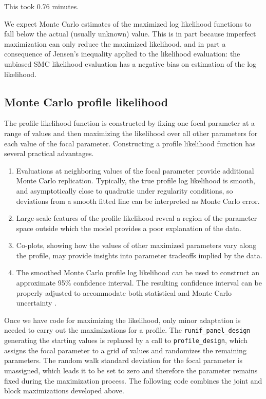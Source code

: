 \documentclass[12pt]{article}\usepackage[]{graphicx}\usepackage[table]{xcolor}
\newcommand\code{\texttt}
\begin{document}
This took 0.76 minutes.

We expect Monte Carlo estimates of the maximized log likelihood functions to fall below the actual (usually unknown) value.
This is in part because imperfect maximization can only reduce the maximized likelihood, and in part a consequence of Jensen's inequality applied to the likelihood evaluation: the unbiased SMC likelihood evaluation has a negative bias on estimation of the log likelihood.

\subsection{Monte Carlo profile likelihood}

The profile likelihood function is constructed by fixing one focal parameter at a range of values and then maximizing the likelihood over all other parameters for each value of the focal parameter.
Constructing a profile likelihood function has several practical advantages.
\begin{enumerate}
\item Evaluations at neighboring values of the focal parameter provide additional Monte Carlo replication. Typically, the true profile log likelihood is smooth, and asymptotically close to quadratic under regularity conditions, so deviations from a smooth fitted line can be interpreted as Monte Carlo error.
\item Large-scale features of the profile likelihood reveal a region of the parameter space outside which the model provides a poor explanation of the data.
\item Co-plots, showing how the values of other maximized parameters vary along the profile, may provide insights into parameter tradeoffs implied by the data.
\item The smoothed Monte Carlo profile log likelihood can be used to construct an approximate 95\% confidence interval.
The resulting confidence interval can be properly adjusted to accommodate both statistical and Monte Carlo uncertainty \citep{ionides17}.
\end{enumerate}

Once we have code for maximizing the likelihood, only minor adaptation is needed to carry out the maximizations for a profile.
The \code{runif\_panel\_design} generating the starting values is replaced by a call to \code{profile\_design}, which assigns the focal parameter to a grid of values and randomizes the remaining parameters.
The random walk standard deviation for the focal parameter is unassigned, which leads it to be set to zero and therefore the parameter remains fixed during the maximization process.
The following code combines the joint and block maximizations developed above.
\end{document}
